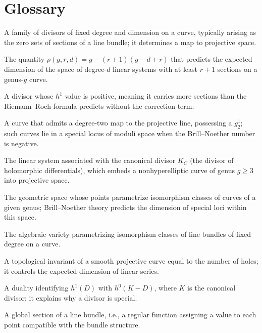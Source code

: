 \section*{Glossary}
\begin{description}[leftmargin=*,style=nextline,itemsep=0.3em]

\item[\textbf{Linear series.}] A family of divisors of fixed degree and dimension on a curve, typically arising as the zero sets of sections of a line bundle; it determines a map to projective space.

\item[\textbf{Brill--Noether number.}] The quantity $\rho(g,r,d)=g-(r+1)(g-d+r)$ that predicts the expected dimension of the space of degree-$d$ linear systems with at least $r+1$ sections on a genus-$g$ curve.

\item[\textbf{Special divisor.}] A divisor whose $h^1$ value is positive, meaning it carries more sections than the Riemann--Roch formula predicts without the correction term.

\item[\textbf{Hyperelliptic curve.}] A curve that admits a degree-two map to the projective line, possessing a $g^1_2$; such curves lie in a special locus of moduli space when the Brill--Noether number is negative.

\item[\textbf{Canonical series.}] The linear system associated with the canonical divisor $K_C$ (the divisor of holomorphic differentials), which embeds a nonhyperelliptic curve of genus $g\geq3$ into projective space.

\item[\textbf{Moduli space.}] The geometric space whose points parametrize isomorphism classes of curves of a given genus; Brill--Noether theory predicts the dimension of special loci within this space.

\item[\textbf{Picard variety.}] The algebraic variety parametrizing isomorphism classes of line bundles of fixed degree on a curve.

\item[\textbf{Genus.}] A topological invariant of a smooth projective curve equal to the number of holes; it controls the expected dimension of linear series.

\item[\textbf{Serre duality.}] A duality identifying $h^1(D)$ with $h^0(K-D)$, where $K$ is the canonical divisor; it explains why a divisor is special.

\item[\textbf{Section.}] A global section of a line bundle, i.e., a regular function assigning a value to each point compatible with the bundle structure.

\end{description}

